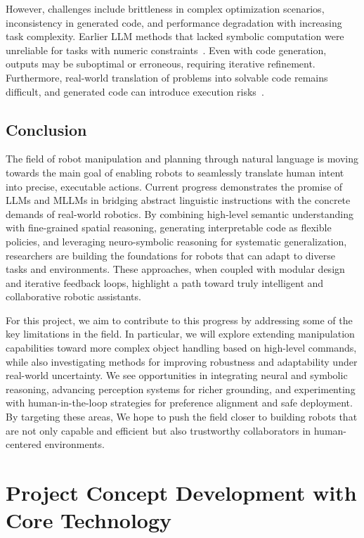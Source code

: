 \documentclass[12pt]{extarticle}
\begin{document}
\begin{enumerate}[label=\Roman*.]
However, challenges include brittleness in complex optimization scenarios, inconsistency in generated code, and performance degradation with increasing task complexity. Earlier LLM methods that lacked symbolic computation were unreliable for tasks with numeric constraints~\cite{code-as-symbolic-planner}. Even with code generation, outputs may be suboptimal or erroneous, requiring iterative refinement. Furthermore, real-world translation of problems into solvable code remains difficult, and generated code can introduce execution risks~\cite{plangenllm}.
\end{enumerate}

\subsection{Conclusion}
The field of robot manipulation and planning through natural language is moving towards the main goal of enabling robots to seamlessly translate human intent into precise, executable actions. Current progress demonstrates the promise of LLMs and MLLMs in bridging abstract linguistic instructions with the concrete demands of real-world robotics. By combining high-level semantic understanding with fine-grained spatial reasoning, generating interpretable code as flexible policies, and leveraging neuro-symbolic reasoning for systematic generalization, researchers are building the foundations for robots that can adapt to diverse tasks and environments. These approaches, when coupled with modular design and iterative feedback loops, highlight a path toward truly intelligent and collaborative robotic assistants.

For this project, we aim to contribute to this progress by addressing some of the key limitations in the field. In particular, we will explore extending manipulation capabilities toward more complex object handling based on high-level commands, while also investigating methods for improving robustness and adaptability under real-world uncertainty. We see opportunities in integrating neural and symbolic reasoning, advancing perception systems for richer grounding, and experimenting with human-in-the-loop strategies for preference alignment and safe deployment. By targeting these areas, We hope to push the field closer to building robots that are not only capable and efficient but also trustworthy collaborators in human-centered environments.

\newpage
\section{Project Concept Development with Core Technology}
\end{document}
